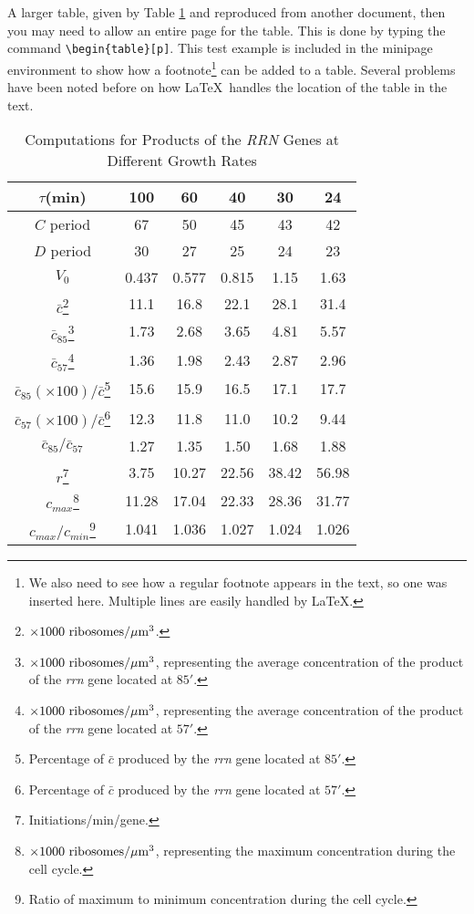 A larger table, given by Table \ref{tab2} and reproduced from another
document, then you may need to allow an entire page for the
table. This is done by typing the command
\verb+\begin{table}[p]+. This test example is included in the
minipage environment to show how a footnote\footnote{We also need to
  see how a regular footnote appears in the text, so one was inserted
  here. Multiple lines are easily handled by \LaTeX.}  can be added to
a table.  Several problems have been noted before on how \LaTeX\
handles the location of the table in the text.
\begin{table}[p]
  \centering
  \begin{minipage}{3.7in}
    \caption{Computations for Products of the \emph{RRN} Genes at Different
      Growth Rates\label{tab2}}
    \begin{tabular}{|c||c|c|c|c|c||}	 \hline
      $\tau$(min)  &  100  &	60 & 40 & 30 & 24 \\ \hline \hline
      $C$ period & 67 & 50  & 45 & 43 & 42 \\ \hline
      $D$ period & 30 & 27  & 25 & 24 & 23 \\ \hline
      $V_0$ & 0.437 & 0.577 & 0.815 & 1.15 & 1.63 \\ \hline
      $\bar c$\footnote{$\times 1000\ {\rm ribosomes}/\mu{\rm m}^3$.}
      & 11.1 & 16.8 & 22.1 & 28.1 & 31.4 \\ \hline
      $\bar c_{85}$\footnote{$\times 1000\ {\rm ribosomes}/\mu{\rm m}^3$,
        representing the average concentration of the product of the
        \emph{rrn} gene located at $85'$.} & 1.73 & 2.68 & 3.65 & 4.81
      & 5.57 \\ \hline 
      $\bar c_{57}$\footnote{$\times 1000\ {\rm ribosomes}/\mu{\rm m}^3$,
        representing the average concentration of the product of the \emph{rrn} gene
        located at $57'$.} & 1.36 & 1.98 & 2.43 & 2.87 & 2.96 \\ \hline
      $\bar c_{85}({\scriptstyle\times 100})/\bar c$\footnote{Percentage of
        $\bar c$ produced by the \emph{rrn} gene located at $85'$.} & 15.6 & 15.9 &
      16.5 & 17.1 & 17.7 \\ \hline
      $\bar c_{57}({\scriptstyle\times 100})/\bar c$\footnote{Percentage of
        $\bar c$ produced by the \emph{rrn} gene located at $57'$.} & 12.3 & 11.8 &
      11.0 & 10.2 & 9.44 \\ \hline
      $\bar c_{85}/\bar c_{57}$ & 1.27 & 1.35 & 1.50 & 1.68 & 1.88 \\ \hline
      $r$\footnote{Initiations/min/gene.} & 3.75 & 10.27
      & 22.56 & 38.42 & 56.98 \\ \hline
      $c_{max}$\footnote{$\times 1000\ {\rm ribosomes}/\mu{\rm m}^3$, representing
        the maximum concentration during the cell cycle.} & 11.28 & 17.04
      & 22.33 & 28.36 & 31.77 \\ \hline
      $c_{max}/c_{min}$\footnote{Ratio of maximum to minimum concentration
        during the cell cycle.} & 1.041 & 1.036 & 1.027 & 1.024 & 1.026 \\ \hline
    \end{tabular}
  \end{minipage}
\end{table}

